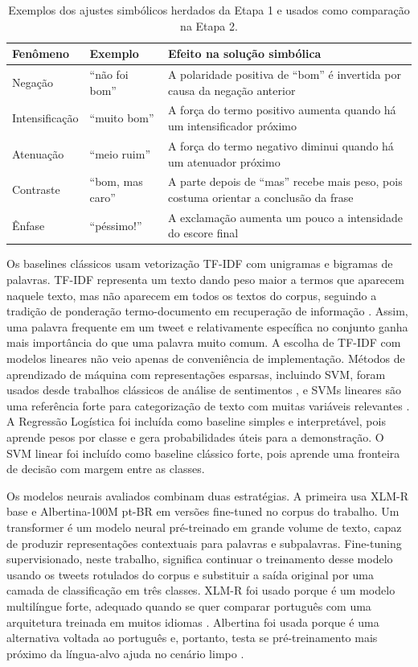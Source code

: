 \documentclass[11pt,a4paper]{article}
\newcommand{\altrowcolors}{\rowcolors{2}{black!4}{white}}
\newcommand{\clearrowcolors}{\rowcolors{2}{}{}}
\begin{document}
\begin{table}[h]
\small
\centering
\altrowcolors
\begin{tabularx}{\linewidth}{@{}L{2.4cm}L{3.4cm}Y@{}}
\toprule
\textbf{Fenômeno} & \textbf{Exemplo} & \textbf{Efeito na solução simbólica} \\
\midrule
Negação & ``não foi bom'' & A polaridade positiva de ``bom'' é invertida por causa da negação anterior \\
Intensificação & ``muito bom'' & A força do termo positivo aumenta quando há um intensificador próximo \\
Atenuação & ``meio ruim'' & A força do termo negativo diminui quando há um atenuador próximo \\
Contraste & ``bom, mas caro'' & A parte depois de ``mas'' recebe mais peso, pois costuma orientar a conclusão da frase \\
Ênfase & ``péssimo!'' & A exclamação aumenta um pouco a intensidade do escore final \\
\bottomrule
\end{tabularx}
\clearrowcolors
\caption{Exemplos dos ajustes simbólicos herdados da Etapa 1 e usados como comparação na Etapa 2.}
\label{tab:simbolico}
\end{table}

Os baselines clássicos usam vetorização TF-IDF com unigramas e bigramas de palavras. TF-IDF representa um texto dando peso maior a termos que aparecem naquele texto, mas não aparecem em todos os textos do corpus, seguindo a tradição de ponderação termo-documento em recuperação de informação \citep{salton1988termweighting}. Assim, uma palavra frequente em um tweet e relativamente específica no conjunto ganha mais importância do que uma palavra muito comum. A escolha de TF-IDF com modelos lineares não veio apenas de conveniência de implementação. Métodos de aprendizado de máquina com representações esparsas, incluindo SVM, foram usados desde trabalhos clássicos de análise de sentimentos \citep{pang2002thumbs}, e SVMs lineares são uma referência forte para categorização de texto com muitas variáveis relevantes \citep{joachims1998text}. A Regressão Logística foi incluída como baseline simples e interpretável, pois aprende pesos por classe e gera probabilidades úteis para a demonstração. O SVM linear foi incluído como baseline clássico forte, pois aprende uma fronteira de decisão com margem entre as classes.

Os modelos neurais avaliados combinam duas estratégias. A primeira usa XLM-R base e Albertina-100M pt-BR em versões fine-tuned no corpus do trabalho. Um transformer é um modelo neural pré-treinado em grande volume de texto, capaz de produzir representações contextuais para palavras e subpalavras. Fine-tuning supervisionado, neste trabalho, significa continuar o treinamento desse modelo usando os tweets rotulados do corpus e substituir a saída original por uma camada de classificação em três classes. XLM-R foi usado porque é um modelo multilíngue forte, adequado quando se quer comparar português com uma arquitetura treinada em muitos idiomas \citep{conneau2020xlmr}. Albertina foi usada porque é uma alternativa voltada ao português e, portanto, testa se pré-treinamento mais próximo da língua-alvo ajuda no cenário limpo \citep{rodrigues2023albertina}.
\end{document}
